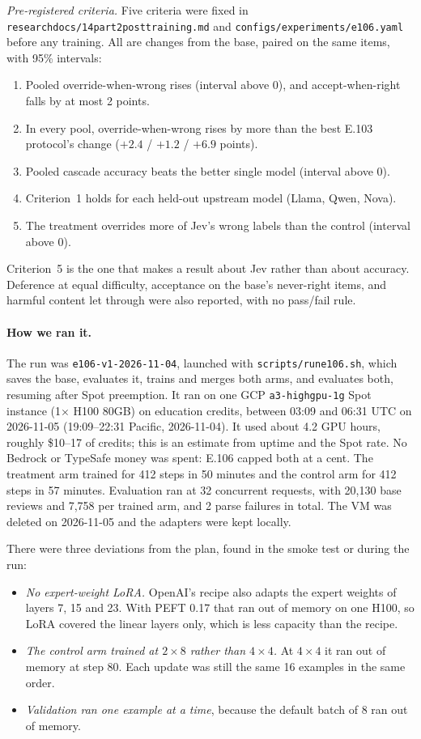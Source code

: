 \documentclass[11pt]{article}
\renewcommand{\_}{\origunderscore\allowbreak}
\begin{document}
\emph{Pre-registered criteria.} Five criteria were fixed in \texttt{research\_docs/14\_part2\_posttraining.md} and \texttt{configs/experiments/e106.yaml} before any training. All are changes from the base, paired on the same items, with 95\% intervals:
\begin{enumerate}[nosep]
  \item Pooled override-when-wrong rises (interval above 0), and accept-when-right falls by at most 2 points.
  \item In every pool, override-when-wrong rises by more than the best E.103 protocol's change ($+2.4$ / $+1.2$ / $+6.9$ points).
  \item Pooled cascade accuracy beats the better single model (interval above 0).
  \item Criterion~1 holds for each held-out upstream model (Llama, Qwen, Nova).
  \item The treatment overrides more of Jev's wrong labels than the control (interval above 0).
\end{enumerate}
Criterion~5 is the one that makes a result about Jev rather than about accuracy. Deference at equal difficulty, acceptance on the base's never-right items, and harmful content let through were also reported, with no pass/fail rule.

\paragraph{How we ran it.}
The run was \texttt{e106-v1-2026-11-04}, launched with \texttt{scripts/run\_e106.sh}, which saves the base, evaluates it, trains and merges both arms, and evaluates both, resuming after Spot preemption. It ran on one GCP \texttt{a3-highgpu-1g} Spot instance (1$\times$ H100 80GB) on education credits, between 03:09 and 06:31 UTC on 2026-11-05 (19:09--22:31 Pacific, 2026-11-04). It used about 4.2 GPU hours, roughly \$10--17 of credits; this is an estimate from uptime and the Spot rate. No Bedrock or TypeSafe money was spent: E.106 capped both at a cent. The treatment arm trained for 412 steps in 50 minutes and the control arm for 412 steps in 57 minutes. Evaluation ran at 32 concurrent requests, with 20,130 base reviews and 7,758 per trained arm, and 2 parse failures in total. The VM was deleted on 2026-11-05 and the adapters were kept locally.

There were three deviations from the plan, found in the smoke test or during the run:
\begin{itemize}[nosep]
  \item \emph{No expert-weight LoRA.} OpenAI's recipe also adapts the expert weights of layers 7, 15 and 23. With PEFT 0.17 that ran out of memory on one H100, so LoRA covered the linear layers only, which is less capacity than the recipe.
  \item \emph{The control arm trained at $2\times8$ rather than $4\times4$.} At $4\times4$ it ran out of memory at step 80. Each update was still the same 16 examples in the same order.
  \item \emph{Validation ran one example at a time}, because the default batch of 8 ran out of memory.
\end{itemize}
\end{document}
